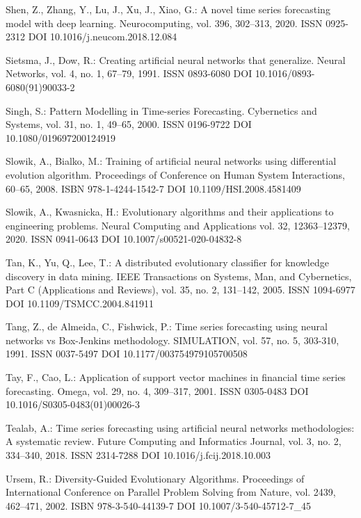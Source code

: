 \begin{thebibliography}{99.}
 Shen, Z., Zhang, Y., Lu, J., Xu, J., Xiao, G.: A novel time series forecasting model with deep learning. Neurocomputing, vol. 396, 302--313, 2020. ISSN 0925-2312 DOI 10.1016/j.neucom.2018.12.084

 Sietsma, J., Dow, R.: Creating artificial neural networks that generalize. Neural Networks, vol. 4, no. 1, 67--79, 1991. ISSN 0893-6080 DOI 10.1016/0893-6080(91)90033-2

 Singh, S.: Pattern Modelling in Time-series Forecasting. Cybernetics and Systems, vol. 31, no. 1, 49--65, 2000. ISSN 0196-9722 DOI 10.1080/019697200124919

 Slowik, A., Bialko, M.: Training of artificial neural networks using differential evolution algorithm. Proceedings of Conference on Human System Interactions, 60--65, 2008. ISBN 978-1-4244-1542-7 DOI 10.1109/HSI.2008.4581409

 Slowik, A., Kwasnicka, H.: Evolutionary algorithms and their applications to engineering problems. Neural Computing and Applications vol. 32, 12363--12379, 2020. ISSN 0941-0643 DOI 10.1007/s00521-020-04832-8

 Tan, K., Yu, Q., Lee, T.: A distributed evolutionary classifier for knowledge discovery in data mining. IEEE Transactions on Systems, Man, and Cybernetics, Part C (Applications and Reviews), vol. 35, no. 2, 131--142, 2005. ISSN 1094-6977 DOI 10.1109/TSMCC.2004.841911

 Tang, Z., de Almeida, C., Fishwick, P.: Time series forecasting using neural networks vs Box-Jenkins methodology. SIMULATION, vol. 57, no. 5, 303-310, 1991. ISSN 0037-5497 DOI 10.1177/003754979105700508

 Tay, F., Cao, L.: Application of support vector machines in financial time series forecasting. Omega, vol. 29, no. 4, 309--317, 2001. ISSN 0305-0483 DOI 10.1016/S0305-0483(01)00026-3

 Tealab, A.: Time series forecasting using artificial neural networks methodologies: A systematic review. Future Computing and Informatics Journal, vol. 3, no. 2, 334--340, 2018. ISSN 2314-7288 DOI 10.1016/j.fcij.2018.10.003

 Ursem, R.: Diversity-Guided Evolutionary Algorithms. Proceedings of International Conference on Parallel Problem Solving from Nature, vol. 2439, 462--471, 2002. ISBN 978-3-540-44139-7 DOI 10.1007/3-540-45712-7\_45


\end{thebibliography}

